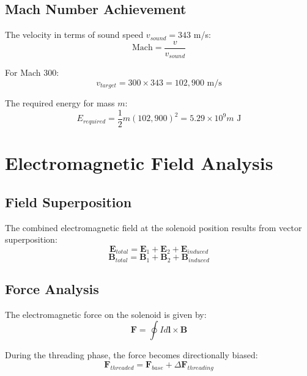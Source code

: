 \documentclass[12pt,a4paper]{article}
\begin{document}
\subsection{Mach Number Achievement}

The velocity in terms of sound speed $v_{sound} = 343$ m/s:
\begin{equation}
\text{Mach} = \frac{v}{v_{sound}}
\end{equation}

For Mach 300:
\begin{equation}
v_{target} = 300 \times 343 = 102,900 \text{ m/s}
\end{equation}

The required energy for mass $m$:
\begin{equation}
E_{required} = \frac{1}{2}m(102,900)^2 = 5.29 \times 10^9 m \text{ J}
\end{equation}

\section{Electromagnetic Field Analysis}

\subsection{Field Superposition}

The combined electromagnetic field at the solenoid position results from vector superposition:
\begin{equation}
\mathbf{E}_{total} = \mathbf{E}_1 + \mathbf{E}_2 + \mathbf{E}_{induced}
\end{equation}
\begin{equation}
\mathbf{B}_{total} = \mathbf{B}_1 + \mathbf{B}_2 + \mathbf{B}_{induced}
\end{equation}

\subsection{Force Analysis}

The electromagnetic force on the solenoid is given by:
\begin{equation}
\mathbf{F} = \oint I d\mathbf{l} \times \mathbf{B}
\end{equation}

During the threading phase, the force becomes directionally biased:
\begin{equation}
\mathbf{F}_{threaded} = \mathbf{F}_{base} + \Delta\mathbf{F}_{threading}
\end{equation}
\end{document}

